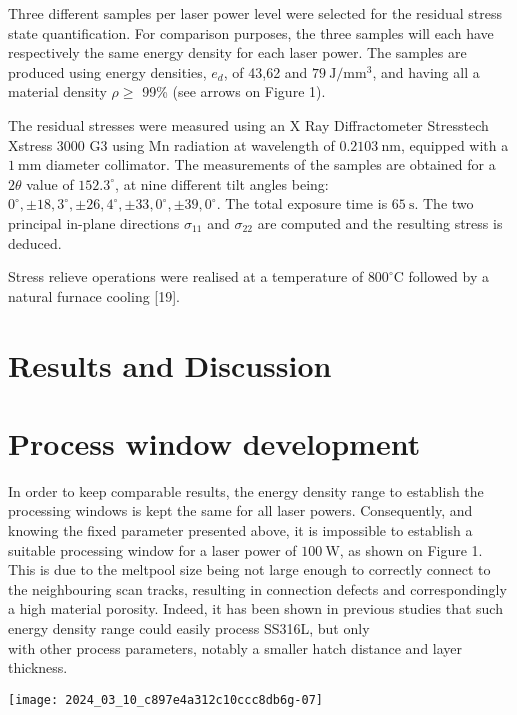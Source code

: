 \documentclass[10pt]{article}
\begin{document}
Three different samples per laser power level were selected for the residual stress state quantification. For comparison purposes, the three samples will each have respectively the same energy density for each laser power. The samples are produced using energy densities, $e_{d}$, of 43,62 and $79 \mathrm{~J} / \mathrm{mm}^{3}$, and having all a material density $\rho \geq$ 99\% (see arrows on Figure 1).

The residual stresses were measured using an X Ray Diffractometer Stresstech Xstress 3000 G3 using Mn radiation at wavelength of $0.2103 \mathrm{~nm}$, equipped with a $1 \mathrm{~mm}$ diameter collimator. The measurements of the samples are obtained for a $2 \theta$ value of $152.3^{\circ}$, at nine different tilt angles being: $0^{\circ}, \pm 18,3^{\circ}, \pm 26,4^{\circ}, \pm 33,0^{\circ}, \pm 39,0^{\circ}$. The total exposure time is $65 \mathrm{~s}$. The two principal in-plane directions $\sigma_{11}$ and $\sigma_{22}$ are computed and the resulting stress is deduced.

Stress relieve operations were realised at a temperature of $800^{\circ} \mathrm{C}$ followed by a natural furnace cooling [19].

\section*{Results and Discussion}
\section*{Process window development}
In order to keep comparable results, the energy density range to establish the processing windows is kept the same for all laser powers. Consequently, and knowing the fixed parameter presented above, it is impossible to establish a suitable processing window for a laser power of $100 \mathrm{~W}$, as shown on Figure 1. This is due to the meltpool size being not large enough to correctly connect to the neighbouring scan tracks, resulting in connection defects and correspondingly a high material porosity. Indeed, it has been shown in previous studies that such energy density range could easily process SS316L, but only\\
with other process parameters, notably a smaller hatch distance and layer thickness.

\begin{center}
\texttt{[image: 2024\_03\_10\_c897e4a312c10ccc8db6g-07]}
\end{center}
\end{document}
